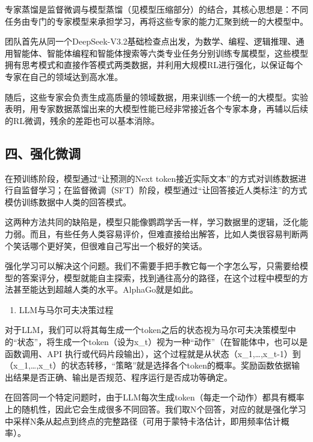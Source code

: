专家蒸馏是监督微调与模型蒸馏（见模型压缩部分）的结合，其核心思想是：不同任务由专门的专家模型来承担学习，再将这些专家的能力汇聚到统一的大模型中。

团队首先从同一个DeepSeek-V3.2基础检查点出发，为数学、编程、逻辑推理、通用智能体、智能体编程和智能体搜索等六类专业任务分别训练专属模型，这些模型拥有思考模式和直接作答模式两类数据，并利用大规模RL进行强化，以保证每个专家在自己的领域达到高水准。

随后，这些专家会负责生成高质量的领域数据，用来训练一个统一的大模型。实验表明，用专家数据蒸馏出来的大模型性能已经非常接近各个专家本身，再辅以后续的RL微调，残余的差距也可以基本消除。

\hypertarget{ux56dbux5f3aux5316ux5faeux8c03}{%
\subsection{四、强化微调}\label{ux56dbux5f3aux5316ux5faeux8c03}}

在预训练阶段，模型通过``让预测的Next token接近实际文本''的方式对训练数据进行自监督学习；在监督微调（SFT）阶段，模型通过``让回答接近人类标注''的方式模仿训练数据中人类的回答模式。

这两种方法共同的缺陷是，模型只能像鹦鹉学舌一样，学习数据里的逻辑，泛化能力弱。而且，有些任务人类容易评价，但难直接给出解答，比如人类很容易判断两个笑话哪个更好笑，但很难自己写出一个极好的笑话。

强化学习可以解决这个问题。我们不需要手把手教它每一个字怎么写，只需要给模型的答案评分，模型就能自主探索，找到通往高分的路径，在这个过程中模型的方法甚至能达到超越人类的水平。AlphaGo就是如此。

\begin{enumerate}
\def\labelenumi{\arabic{enumi}.}
\tightlist
\item
  LLM与马尔可夫决策过程
\end{enumerate}

对于LLM，我们可以将其每生成一个token之后的状态视为马尔可夫决策模型中的``状态''，将生成一个token（设为x\_t）视为一种``动作''（在智能体中，也可以是函数调用、API 执行或代码片段输出），这个过程就是从状态（x\_1,\ldots,x\_t-1）到（x\_1,\ldots,x\_t）的状态转移，``策略''就是选择各个token的概率。奖励函数依据输出结果是否正确、输出是否规范、程序运行是否成功等确定。

在回答同一个特定问题时，由于LLM每次生成token（每走一个动作）都具有概率上的随机性，因此它会生成很多不同回答。我们取N个回答，对应的就是强化学习中采样N条从起点到终点的完整路径（可用于蒙特卡洛估计，即用频率估计概率）。

